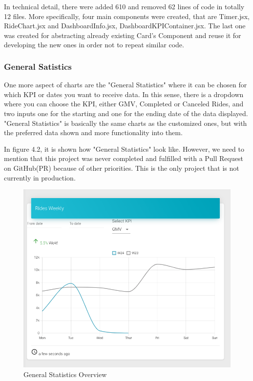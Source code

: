 In technical detail, there were added 610 and removed 62 lines of code in totally 12 files. More specifically, four main components were created, that are Timer.jsx, RideChart.jsx and DashboardInfo.jsx, DashboardKPIContainer.jsx. The last one was created for abstracting already existing Card's Component and reuse it for developing the new ones in order not to repeat similar code. \par

\subsubsection{General Satistics}

One more aspect of charts are the "General Statistics" where it can be chosen for which KPI or dates you want to receive data. In this sense, there is a dropdown where you can choose the KPI, either GMV, Completed or Canceled Rides, and two inputs one for the starting and one for the ending date of the data displayed. "General Statistics" is basically the same charts as the customized ones, but with the preferred data shown and more functionality into them. \par
In figure 4.2, it is shown how "General Statistics" look like. However, we need to mention that this project was never completed and fulfilled with a Pull Request on GitHub(PR) because of other priorities. This is the only project that is not currently in production. \par


\begin{figure}[H]
	\begin{center}
		\includegraphics[scale=0.3]{images/my_projects/Statistics/General_Statistics.png}
	\end{center}
	\caption{General Statistics Overview}
\end{figure}


